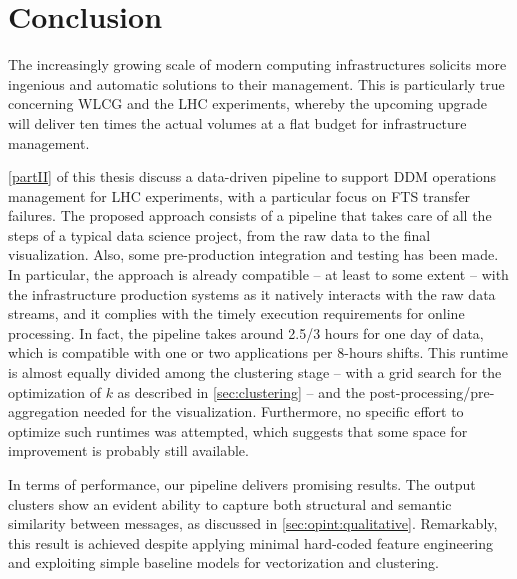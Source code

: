 \chapter{Conclusion} \label{ch:opint:conclusion}

The increasingly growing scale of modern computing infrastructures solicits more ingenious and automatic solutions to their management.
This is particularly true concerning WLCG and the LHC experiments, whereby the upcoming upgrade will deliver ten times the actual volumes at a flat budget for infrastructure management.

\cref{partII} of this thesis discuss a data-driven pipeline to support DDM operations management for LHC experiments, with a particular focus on FTS transfer failures.
The proposed approach consists of a pipeline that takes care of all the steps of a typical data science project, from the raw data to the final visualization.
Also, some pre-production integration and testing has been made.
In particular, the approach is already compatible -- at least to some extent -- with the infrastructure production systems as it natively interacts with the raw data streams, and it complies with the timely execution requirements for online processing.
In fact,
the pipeline takes around 2.5/3 hours for one day of data, which is compatible with one or two applications per 8-hours shifts.
This runtime is almost equally divided among the clustering stage -- with a grid search for the optimization of $k$ as described in \cref{sec:clustering} -- and the post-processing/pre-aggregation needed for the visualization.
Furthermore, no specific effort to optimize such runtimes was attempted, which suggests that some space for improvement is probably still available.

In terms of performance, our pipeline delivers promising results. 
The output clusters show an evident ability to capture both structural and semantic similarity between messages, as discussed in \cref{sec:opint:qualitative}.
Remarkably, this result is achieved despite applying minimal hard-coded feature engineering and exploiting simple baseline models for vectorization and clustering. 


